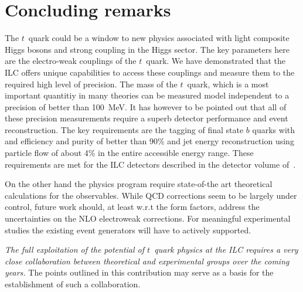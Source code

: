 \section{Concluding remarks}
The $t$~quark could be a window to new physics associated with light 
composite Higgs bosons and strong coupling in the Higgs sector.
The key parameters here are the electro-weak couplings of the $t$~quark.  
We have demonstrated that the ILC offers unique capabilities
to access these couplings and measure them to the required high level of
 precision. The mass of the $t$~quark, which is a most important quantitiy
in many theories can be measured model independent to a precision of 
 better than 100~MeV. It has however to be pointed out that 
all of these precision measurements require a superb detector performance and 
event reconstruction. The key requirements are the tagging of final state
$b$ quarks with and efficiency and purity of better than 90\% and jet
 energy reconstruction using particle flow of about 4\% in the entire
 accessible energy range. These requirements are met for the ILC detectors
described in the detector volume of~\cite{bib:ilc-tdr-dbd}. 

On the other hand the physics program require state-of-the art theoretical calculations for the observables. While QCD corrections seem to be largely under control, future work should, at least w.r.t the form factors, address the uncertainties on the NLO electroweak corrections. For meaningful experimental studies the existing event generators will have to actively supported.  

{\em The full exploitation of the potential of $t$~quark physics at the ILC requires a very close collaboration between  theoretical and experimental 
groups over the coming years.} The points outlined in this contribution may serve as a basis for the establishment of such a collaboration.
